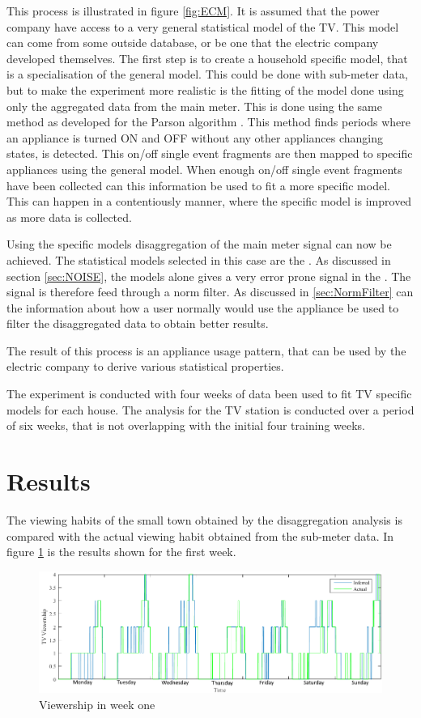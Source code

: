 This process is illustrated in figure \ref{fig:ECM}. It is assumed that the power company have access to a very general statistical model of the TV. This model can come from some outside database, or be one that the electric company developed themselves. The first step is to create a household specific model, that is a specialisation of the general model. This could be done with sub-meter data, but to make the experiment more realistic is the fitting of the model done using only the aggregated data from the main meter. This is done using the same method as developed for the Parson algorithm \citep{RefWorks:28}. This method finds periods where an appliance is turned ON and OFF without any other appliances changing states, is detected. This on/off single event fragments are then mapped to specific appliances using the general model. When enough on/off single event fragments have been collected can this information be used to fit a more specific model. This can happen in a contentiously manner, where the specific model is improved as more data is collected.  

Using the specific models disaggregation of the main meter signal can now be achieved. The statistical models selected in this case are the . As discussed in section \ref{sec:NOISE}, the models alone gives a very error prone signal in the . The signal is therefore feed through a norm filter. As discussed in \ref{sec:NormFilter} can the information about how a user normally would use the appliance be used to filter the disaggregated data to obtain better results. 

The result of this process is an appliance usage pattern, that can be used by the electric company to derive various statistical properties.  

The experiment is conducted with four weeks of data been used to fit TV specific models for each house. The analysis for the TV station is conducted over a period of six weeks, that is not overlapping with the initial four training weeks. 

\section{Results}
The viewing habits of the small town obtained by the disaggregation analysis is compared with the actual viewing habit obtained from the sub-meter data. In figure \ref{fig:WHW} is the results shown for the first week.   

\begin{figure}[H]
\centering
\includegraphics[width=1\textwidth]{billeder/Viewership.png}
\caption{Viewership in week one}
\label{fig:WHW}
\end{figure}

